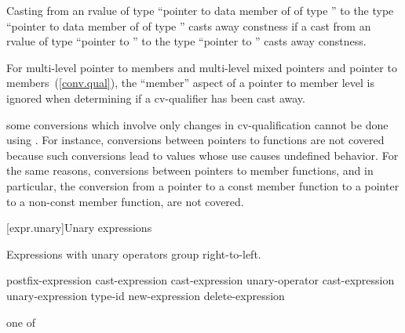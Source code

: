 \pnum
Casting from an rvalue of type ``pointer to data member of  of
type '' to the type ``pointer to data member of  of
type '' casts away constness if a cast from an rvalue of type
``pointer to '' to the type ``pointer to '' casts
away constness.

\pnum
For multi-level pointer to members and multi-level mixed pointers and
pointer to members~(\ref{conv.qual}), the ``member'' aspect of a pointer
to member level is ignored when determining if a 
cv-qualifier has been cast away.

\pnum
\enternote 
some conversions which involve only changes in cv-qualification cannot
be done using . For instance, conversions between
pointers to functions are not covered because such conversions lead to
values whose use causes undefined behavior. For the same reasons,
conversions between pointers to member functions, and in particular, the
conversion from a pointer to a const member function to a pointer to a
non-const member function, are not covered.
\exitnote%

[expr.unary]{Unary expressions}

\pnum
{}%
Expressions with unary operators group right-to-left.

%
%
%
%
%
\begin{bnf}
\br
    postfix-expression\br
    \terminal{++} cast-expression\br
    \terminal{-{-}} cast-expression\br
    unary-operator cast-expression\br
     unary-expression\br
     type-id \terminal{)}\br
    new-expression\br
    delete-expression
\end{bnf}

%
%
%
%
%
%
%
%
%
%
%
%
%
%
%
\begin{bnf}
 \textnormal{one of}\br
    \terminal{*  \&  +  -  !  \tilde}
\end{bnf}

